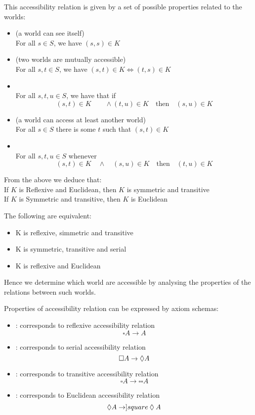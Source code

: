 This accessibility relation is given by a set of possible properties related to the worlds:
\begin{itemize}
\item {} (a world can see itself)\\
For all $s\in S$, we have $(s,s)\in K$
\item {} (two worlds are mutually accessible)\\
For all $s,t \in S$, we have $(s,t)\in K \iff (t,s)\in K$
\item {}\\
For all $s,t,u \in S$, we have that if 
\[(s,t)\in K \qquad \land (t,u)\in K \quad\text{then}\quad (s,u)\in K\]
\item {} (a world can access at least another world)\\
For all $s\in S$ there is some $t$ such that $(s,t)\in K$
\item {}\\
For all $s,t,u\in S$ whenever
\[(s,t)\in K \quad\land\quad (s,u)\in K\quad\text{then}\quad (t,u)\in K\]
\end{itemize}
From the above we deduce that:\\
If $K$ is Reflexive and Euclidean, then $K$ is symmetric and transitive\\
If $K$ is Symmetric and transitive, then $K$ is Euclidean

The following are equivalent:
\begin{itemize}
\item K is reflexive, simmetric and transitive
\item K is symmetric, transitive and serial 
\item K is reflexive and Euclidean
\end{itemize}
Hence we determine which world are accessible by analysing the properties of the relations between such worlds.

Properties of accessibility relation can be expressed by axiom schemas:
\begin{itemize}
\item {}: corresponds to reflexive accessibility relation
\[\square A \rightarrow A\]
\item {}: corresponds to serial accessibility relation
\[\square A \rightarrow \mathbin{\Diamond} A\]
\item {}: corresponds to transitive accessibility relation
\[\square A \rightarrow \square\square A\]
\item {}: corresponds to Euclidean accessibility relation
\[\mathbin{\Diamond} A\rightarrow ]square \mathbin{\Diamond} A\]
\end{itemize}

